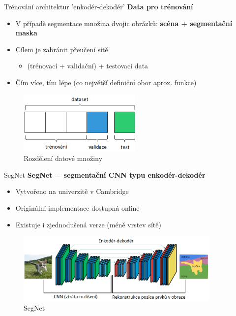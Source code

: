\documentclass[aspectratio=1610]{beamer}
\begin{document}
\begin{frame}{Trénování architektur 'enkodér-dekodér'}
\textbf{Data pro trénování}
\begin{itemize}
	\item V případě segmentace množina dvojic obrázků: \textbf{scéna + segmentační maska}
	\item Cílem je zabránit přeučení sítě
	\begin{itemize}
		\item (trénovací + validační) + testovací data
	\end{itemize}
	\item Čím více, tím lépe (co největší definiční obor aprox. funkce)
\end{itemize}
\begin{figure}[h]
	\begin{center}
		\includegraphics[width=6cm, keepaspectratio]{dataset.png}
	\end{center}
	\caption{Rozdělení datové množiny} 	
\end{figure}

\end{frame}
\begin{frame}{SegNet}
\textbf{SegNet = segmentační CNN typu enkodér-dekodér}
\begin{itemize}
	\item Vytvořeno na univerzitě v Cambridge
	\item Originální implementace dostupná online	
	\item Existuje i zjednodušená verze (méně vrstev sítě)
\end{itemize}
\begin{figure}[h]
	\begin{center}
		\includegraphics[width=10cm, keepaspectratio]{segnet.png}
	\end{center}
	\caption{SegNet} 	
\end{figure}
\end{frame}
\end{document}
